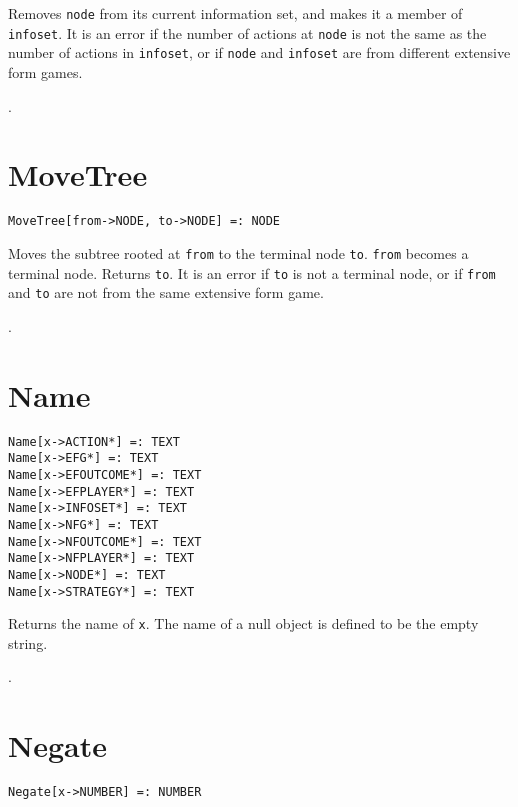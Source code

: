 \noindent
Removes \verb+node+ from its current information set, and makes it a
member of \verb+infoset+. It is an error if the number of actions at
\verb+node+ is not the same as the number of actions in
\verb+infoset+, or if \verb+node+ and \verb+infoset+ are from
different extensive form games.   

\seealso {}.


\section*{MoveTree}\label{PrimMoveTree}
\begin{verbatim}
MoveTree[from->NODE, to->NODE] =: NODE 
\end{verbatim}

\noindent
Moves the subtree rooted at \verb+from+ to
the terminal node \verb+to+.  \verb+from+ becomes a terminal node.
Returns \verb+to+.  It is an error if \verb+to+ is not a terminal
node, or if \verb+from+ and \verb+to+ are not from the same extensive
form game.

\seealso {}.


\section*{Name}\label{PrimName}
\begin{verbatim}
Name[x->ACTION*] =: TEXT
Name[x->EFG*] =: TEXT
Name[x->EFOUTCOME*] =: TEXT
Name[x->EFPLAYER*] =: TEXT
Name[x->INFOSET*] =: TEXT
Name[x->NFG*] =: TEXT
Name[x->NFOUTCOME*] =: TEXT
Name[x->NFPLAYER*] =: TEXT
Name[x->NODE*] =: TEXT
Name[x->STRATEGY*] =: TEXT
\end{verbatim}

\noindent
Returns the name of \verb+x+.  The name of a null object is defined
to be the empty string.

\seealso {}.


\section*{Negate}\label{PrimNegate}
\begin{verbatim}
Negate[x->NUMBER] =: NUMBER 
\end{verbatim}

